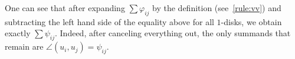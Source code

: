 
One can see that after expanding $\sum\varphi_{ij}$ by the definition (see~\ref{rule:vv}) and subtracting the left hand side of the equality above for all $1$-disks, we obtain exactly $\sum\psi_{ij}$. Indeed, after canceling everything out, the only summands that remain are $\angle(u_i, u_j) = \psi_{ij}$.

